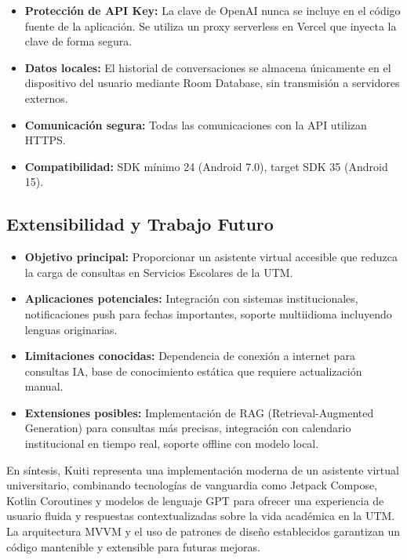 \begin{itemize}
    \item \textbf{Protección de API Key:} La clave de OpenAI nunca se incluye en el código fuente de la aplicación. Se utiliza un proxy serverless en Vercel que inyecta la clave de forma segura.
    \item \textbf{Datos locales:} El historial de conversaciones se almacena únicamente en el dispositivo del usuario mediante Room Database, sin transmisión a servidores externos.
    \item \textbf{Comunicación segura:} Todas las comunicaciones con la API utilizan HTTPS.
    \item \textbf{Compatibilidad:} SDK mínimo 24 (Android 7.0), target SDK 35 (Android 15).
\end{itemize}

\vspace{1em}
\subsection{Extensibilidad y Trabajo Futuro}
\label{subsec:extensibilidad}

\begin{itemize}
    \item \textbf{Objetivo principal:} Proporcionar un asistente virtual accesible que reduzca la carga de consultas en Servicios Escolares de la UTM.
    \item \textbf{Aplicaciones potenciales:} Integración con sistemas institucionales, notificaciones push para fechas importantes, soporte multiidioma incluyendo lenguas originarias.
    \item \textbf{Limitaciones conocidas:} Dependencia de conexión a internet para consultas IA, base de conocimiento estática que requiere actualización manual.
    \item \textbf{Extensiones posibles:} Implementación de RAG (Retrieval-Augmented Generation) para consultas más precisas, integración con calendario institucional en tiempo real, soporte offline con modelo local.
\end{itemize}

\vspace{0.5em}

\noindent En síntesis, Kuiti representa una implementación moderna de un asistente virtual universitario, combinando tecnologías de vanguardia como Jetpack Compose, Kotlin Coroutines y modelos de lenguaje GPT para ofrecer una experiencia de usuario fluida y respuestas contextualizadas sobre la vida académica en la UTM. La arquitectura MVVM y el uso de patrones de diseño establecidos garantizan un código mantenible y extensible para futuras mejoras.

